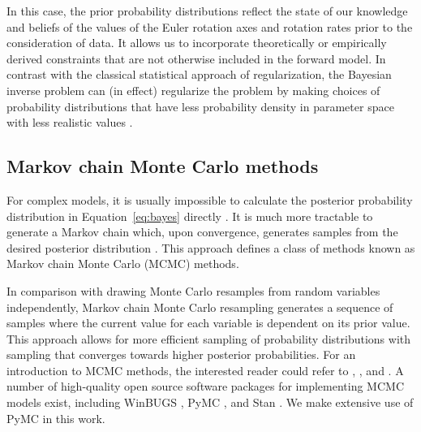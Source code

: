 \documentclass[11pt,letterpaper]{article}
\begin{document}

In this case, the prior probability distributions reflect the state of our knowledge and beliefs of the values of the Euler rotation axes and rotation rates prior to the consideration of data. It allows us to incorporate theoretically or empirically derived constraints that are not otherwise included in the forward model. In contrast with the classical statistical approach of regularization, the Bayesian inverse problem can (in effect) regularize the problem by making
choices of probability distributions that have less probability density in parameter space with less realistic values \citep[e.g.][]{Minson2013a, Sambridge2013a}.

\subsection*{Markov chain Monte Carlo methods}

For complex models, it is usually impossible to calculate the posterior probability distribution in Equation~\eqref{eq:bayes} directly \citep{Davidson-Pilon2015a}. It is much more tractable to generate a Markov chain which, upon convergence, generates samples from the desired posterior distribution \citep{Gelman2013a}. This approach defines a class of methods known as Markov chain Monte Carlo (MCMC) methods. 


In comparison with drawing Monte Carlo resamples from random variables independently, Markov chain Monte Carlo resampling generates a sequence of samples where the current value for each variable is dependent on its prior value. This approach allows for more efficient sampling of probability distributions with sampling that converges towards higher posterior probabilities. For an introduction to MCMC methods, the interested reader could refer to \cite{Gelman1996a}, \cite{Sambridge2013a}, and \cite{Davidson-Pilon2015a}. A number of high-quality open source software packages for implementing MCMC models exist, including WinBUGS \citep{Lunn2000a}, PyMC \citep{Salvatier2016a}, and Stan \citep{Carpenter2017a}. We make extensive use of PyMC in this work.
\end{document}
